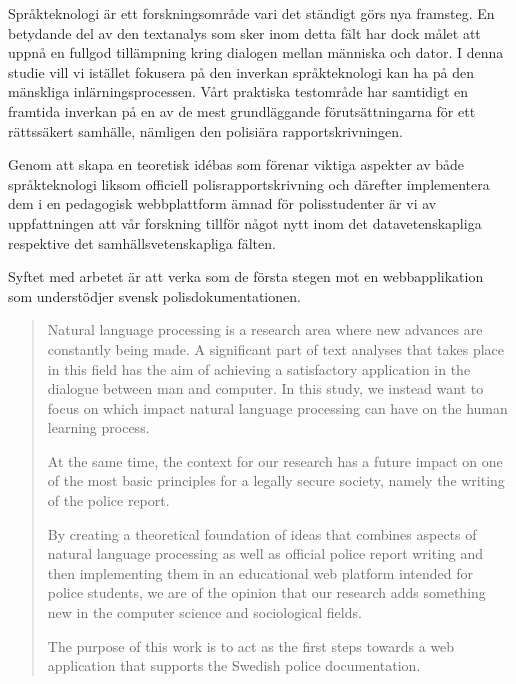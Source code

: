 \documentclass[swedish]{maucsthesis}
\begin{document}

\author{Kalle Lindqvist \and Henrik Svensson}

\subject{datavetenskap}


\maketitle %

\begin{sammanfattning}
  Språkteknologi är ett forskningsområde vari det ständigt görs nya framsteg. En
  betydande del av den textanalys som sker inom detta fält har dock målet att
  uppnå en fullgod tillämpning kring dialogen mellan människa och dator. I denna
  studie vill vi istället fokusera på den inverkan språkteknologi kan ha på den
  mänskliga inlärningsprocessen. Vårt praktiska testområde har samtidigt en
  framtida inverkan på en av de mest grundläggande förutsättningarna för ett
  rättssäkert samhälle, nämligen den polisiära rapportskrivningen.

  Genom att skapa en teoretisk idébas som förenar viktiga aspekter av både
  språkteknologi liksom officiell polisrapportskrivning och därefter
  implementera dem i en pedagogisk webbplattform ämnad för polisstudenter är vi
  av uppfattningen att vår forskning tillför något nytt inom det
  datavetenskapliga respektive det samhällsvetenskapliga fälten.

  Syftet med arbetet är att verka som de första stegen mot en webbapplikation
  som understödjer svensk polisdokumentationen.
\end{sammanfattning}

\begin{abstract}
  Natural language processing is a research area where new advances are
  constantly being made. A significant part of text analyses that takes place in
  this field has the aim of achieving a satisfactory application in the dialogue
  between man and computer. In this study, we instead want to focus on which
  impact natural language processing can have on the human learning process.

  At the same time, the context for our research has a future impact on one of
  the most basic principles for a legally secure society, namely the writing of
  the police report.

  By creating a theoretical foundation of ideas that combines aspects of natural
  language processing as well as official police report writing and then
  implementing them in an educational web platform intended for police students,
  we are of the opinion that our research adds something new in the computer
  science and sociological fields.

  The purpose of this work is to act as the first steps towards a web
  application that supports the Swedish police documentation.
\end{abstract}
\end{document}

